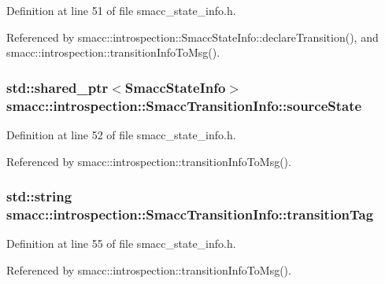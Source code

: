 Definition at line 51 of file smacc\+\_\+state\+\_\+info.\+h.



Referenced by smacc\+::introspection\+::\+Smacc\+State\+Info\+::declare\+Transition(), and smacc\+::introspection\+::transition\+Info\+To\+Msg().

\subsubsection[{\texorpdfstring{source\+State}{sourceState}}]{\setlength{\rightskip}{0pt plus 5cm}std\+::shared\+\_\+ptr$<${\bf Smacc\+State\+Info}$>$ smacc\+::introspection\+::\+Smacc\+Transition\+Info\+::source\+State}\hypertarget{structsmacc_1_1introspection_1_1SmaccTransitionInfo_aa44f16d098eb91ed222008fe0abf1275}{}\label{structsmacc_1_1introspection_1_1SmaccTransitionInfo_aa44f16d098eb91ed222008fe0abf1275}


Definition at line 52 of file smacc\+\_\+state\+\_\+info.\+h.



Referenced by smacc\+::introspection\+::transition\+Info\+To\+Msg().

\subsubsection[{\texorpdfstring{transition\+Tag}{transitionTag}}]{\setlength{\rightskip}{0pt plus 5cm}std\+::string smacc\+::introspection\+::\+Smacc\+Transition\+Info\+::transition\+Tag}\hypertarget{structsmacc_1_1introspection_1_1SmaccTransitionInfo_aece8c6af9a682232a435ca1d92b953bd}{}\label{structsmacc_1_1introspection_1_1SmaccTransitionInfo_aece8c6af9a682232a435ca1d92b953bd}


Definition at line 55 of file smacc\+\_\+state\+\_\+info.\+h.



Referenced by smacc\+::introspection\+::transition\+Info\+To\+Msg().

